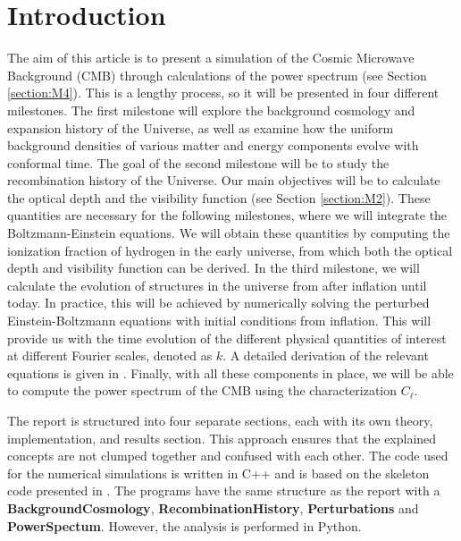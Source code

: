 \documentclass{aa}
\begin{document}
\section{Introduction}
The aim of this article is to present a simulation of the Cosmic Microwave Background (CMB) through calculations of the power spectrum (see Section \ref{section:M4}). This is a lengthy process, so it will be presented in four different milestones. The first milestone will explore the background cosmology and expansion history of the Universe, as well as examine how the uniform background densities of various matter and energy components evolve with conformal time. The goal of the second milestone will be to study the recombination history of the Universe. Our main objectives will be to calculate the optical depth and the visibility function (see Section \ref{section:M2}). These quantities are necessary for the following milestones, where we will integrate the Boltzmann-Einstein equations. We will obtain these quantities by computing the ionization fraction of hydrogen in the early universe, from which both the optical depth and visibility function can be derived. In the third milestone, we will calculate the evolution of structures in the universe from after inflation until today. In practice, this will be achieved by numerically solving the perturbed Einstein-Boltzmann equations with initial conditions from inflation. This will provide us with the time evolution of the different physical quantities of interest at different Fourier scales, denoted as $k$. A detailed derivation of the relevant equations is given in \cite{3}. Finally, with all these components in place, we will be able to compute the power spectrum of the CMB using the characterization $C_\ell$.

The report is structured into four separate sections, each with its own theory, implementation, and results section. This approach ensures that the explained concepts are not clumped together and confused with each other. The code used for the numerical simulations is written in C++ and is based on the skeleton code presented in \cite{3}. The programs have the same structure as the report with a \textbf{BackgroundCosmology}, \textbf{RecombinationHistory}, \textbf{Perturbations} and \textbf{PowerSpectum}. However, the analysis is performed in Python.


\end{document}

